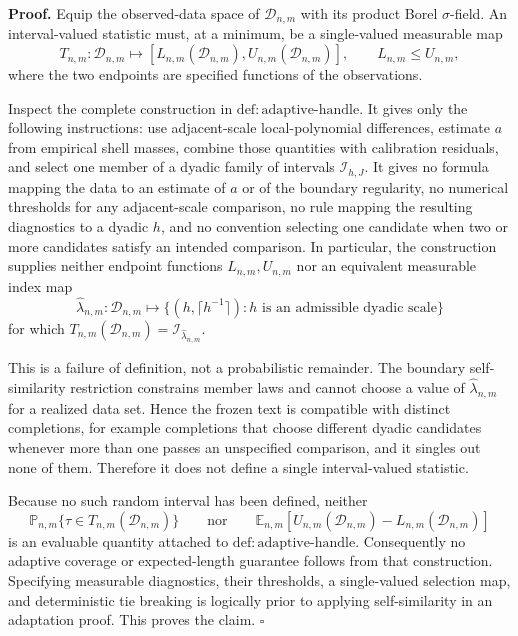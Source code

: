 \textbf{Proof.}
Equip the observed-data space of \(\mathcal D_{n,m}\) with its product Borel \(\sigma\)-field.  An interval-valued statistic must, at a minimum, be a single-valued measurable map
\[
T_{n,m}:\mathcal D_{n,m}\longmapsto [L_{n,m}(\mathcal D_{n,m}),U_{n,m}(\mathcal D_{n,m})],
\qquad L_{n,m}\le U_{n,m},
\]
where the two endpoints are specified functions of the observations.

Inspect the complete construction in \(\mathrm{def:adaptive\text{-}handle}\).  It gives only the following instructions: use adjacent-scale local-polynomial differences, estimate \(a\) from empirical shell masses, combine those quantities with calibration residuals, and select one member of a dyadic family of intervals \(\mathcal I_{h,J}\).  It gives no formula mapping the data to an estimate of \(a\) or of the boundary regularity, no numerical thresholds for any adjacent-scale comparison, no rule mapping the resulting diagnostics to a dyadic \(h\), and no convention selecting one candidate when two or more candidates satisfy an intended comparison.  In particular, the construction supplies neither endpoint functions \(L_{n,m},U_{n,m}\) nor an equivalent measurable index map
\[
\widehat\lambda_{n,m}:\mathcal D_{n,m}\longmapsto
\{(h,\lceil h^{-1}\rceil):h\text{ is an admissible dyadic scale}\}
\]
for which \(T_{n,m}(\mathcal D_{n,m})=\mathcal I_{\widehat\lambda_{n,m}}\).

This is a failure of definition, not a probabilistic remainder.  The boundary self-similarity restriction constrains member laws and cannot choose a value of \(\widehat\lambda_{n,m}\) for a realized data set.  Hence the frozen text is compatible with distinct completions, for example completions that choose different dyadic candidates whenever more than one passes an unspecified comparison, and it singles out none of them.  Therefore it does not define a single interval-valued statistic.

Because no such random interval has been defined, neither
\[
\mathbb P_{n,m}\{\tau\in T_{n,m}(\mathcal D_{n,m})\}
\qquad\text{nor}\qquad
\mathbb E_{n,m}\!\left[U_{n,m}(\mathcal D_{n,m})-L_{n,m}(\mathcal D_{n,m})\right]
\]
is an evaluable quantity attached to \(\mathrm{def:adaptive\text{-}handle}\).  Consequently no adaptive coverage or expected-length guarantee follows from that construction.  Specifying measurable diagnostics, their thresholds, a single-valued selection map, and deterministic tie breaking is logically prior to applying self-similarity in an adaptation proof.  This proves the claim. \(\square\)